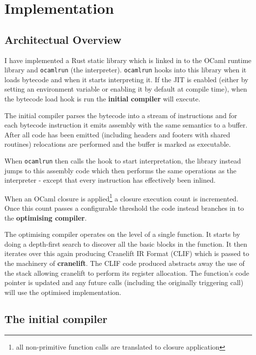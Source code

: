 \chapter{Implementation}

\section{Architectual Overview}



I have implemented a Rust static library which is linked in to the OCaml runtime library and
\texttt{ocamlrun} (the interpreter).
\texttt{ocamlrun} hooks into this library when it loads bytecode and when it starts
interpreting it.
If the JIT is enabled (either by setting an environment variable or enabling it by default at
compile time),
when the bytecode load hook is run the \textbf{initial compiler} will execute.

The initial compiler parses the bytecode into a stream of instructions and for each bytecode
instruction
it emits assembly with the same semantics to a buffer. After all code has been emitted (including
headers
and footers with shared routines) relocations are performed and the buffer is marked as executable.

When \texttt{ocamlrun} then calls the hook to start interpretation, the library instead jumps to
this assembly code which then performs the same operations as the interpreter - except that every
instruction has effectively been inlined.

When an OCaml closure is applied\footnote{all non-primitive function calls are translated to
    closure application}
a closure execution count is incremented. Once this count passes a configurable threshold the code
instead
branches in to the \textbf{optimising compiler}.

The optimising compiler operates on the level of a single function. It starts by doing a
depth-first search to discover all the basic blocks in the function. It then iterates over this
again producing Cranelift IR Format (CLIF) which is passed to the machinery of
\textbf{cranelift}. The CLIF code produced abstracts away the use of the stack allowing cranelift
to perform its register allocation. The function's code pointer is updated and any future calls
(including the originally triggering call) will use the optimised implementation.

\section{The initial compiler}

